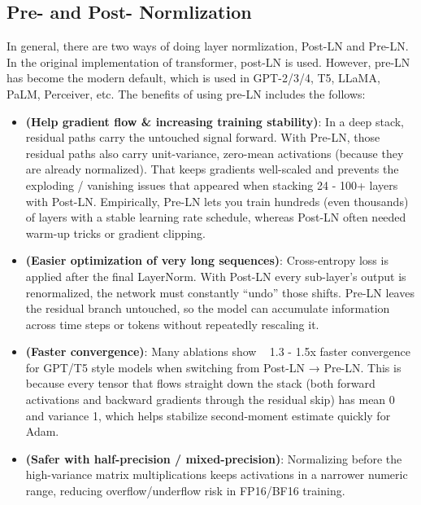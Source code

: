 \documentclass[11pt]{article}  %
\begin{document}
\subsection{Pre- and Post- Normlization}
In general, there are two ways of doing layer normlization, Post-LN and Pre-LN. 
In the original implementation of transformer, post-LN is used. 
However, pre-LN has become the modern default, which is used in GPT-2/3/4, T5, LLaMA, PaLM, Perceiver, etc.
The benefits of using pre-LN includes the follows:
\begin{itemize}
  \item {\bf (Help gradient flow \& increasing training stability)}: In a deep stack, residual paths carry the untouched signal forward. 
  With Pre-LN, those residual paths also carry unit-variance, zero-mean activations (because they are already normalized). 
  That keeps gradients well-scaled and prevents the exploding / vanishing issues that appeared when stacking 24 - 100+ layers with Post-LN.
  Empirically, Pre-LN lets you train hundreds (even thousands) of layers with a stable learning rate schedule, whereas Post-LN often needed warm-up tricks or gradient clipping.
  \item {\bf (Easier optimization of very long sequences)}: Cross-entropy loss is applied after the final LayerNorm.
  With Post-LN every sub-layer's output is renormalized, the network must constantly “undo” those shifts.
  Pre-LN leaves the residual branch untouched, so the model can accumulate information across time steps or tokens without repeatedly rescaling it.
  \item {\bf (Faster convergence)}: Many ablations show ~ 1.3 - 1.5x faster convergence for GPT/T5 style models when switching from Post-LN → Pre-LN. This is because every tensor that flows straight down the stack (both forward activations and backward gradients through the residual skip) has mean 0 and variance 1, which helps stabilize second-moment estimate quickly for Adam.
  \item {\bf (Safer with half-precision / mixed-precision)}: Normalizing before the high-variance matrix multiplications keeps activations in a narrower numeric range, reducing overflow/underflow risk in FP16/BF16 training.
\end{itemize}
\end{document}
